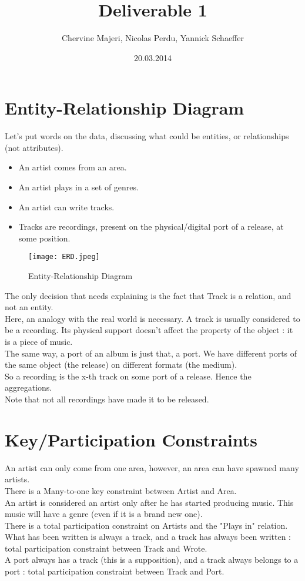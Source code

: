 \documentclass[a4paper,10pt]{article}
\title{Deliverable 1}
\author{Chervine Majeri, Nicolas Perdu, Yannick Schaeffer}
\date{20.03.2014}
\begin{document}
\maketitle
\section{Entity-Relationship Diagram}
Let's put words on the data, discussing what could be entities, or relationships (not attributes).\\
\begin{itemize}
\item An artist comes from an area.
\item An artist plays in a set of genres.
\item An artist can write tracks.
\item Tracks are recordings, present on the physical/digital port of a release, at some position.
\end{itemize}
\begin{figure}[ht!]
\centering
\texttt{[image: ERD.jpeg]}
\caption{Entity-Relationship Diagram}
\label{overflow}
\end{figure}
\newpage
The only decision that needs explaining is the fact that Track is a relation, and not an entity.\\
Here, an analogy with the real world is necessary. A track is usually considered to be a recording. 
Its physical support doesn't affect the property of the object : it is a piece of music.\\
The same way, a port of an album is just that, a port. We have different ports of the same object (the release) on different formats (the medium).\\
So a recording is the x-th track on some port of a release. Hence the aggregations.\\
Note that not all recordings have made it to be released.\\
\section{Key/Participation Constraints}
An artist can only come from one area, however, an area can have spawned many artists.\\
There is a Many-to-one key constraint between Artist and Area.\\
An artist is considered an artist only after he has started producing music. This music will have a genre (even if it is a brand new one).\\
There is a total participation constraint on Artists and the "Plays in" relation.\\
What has been written is always a track, and a track has always been written : total participation constraint between Track and Wrote.\\
A port always has a track (this is a supposition), and a track always belongs to a port : total participation constraint between Track and Port.\\
\end{document}
